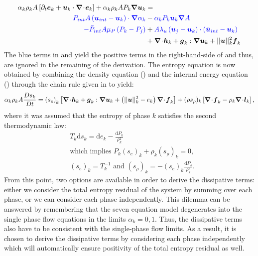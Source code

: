 \begin{align}\label{eq:int-ener-7-eqn-model-sect4}
\alpha_k \rho_k  A \left[ \partial_t \boldsymbol e_k + \boldsymbol u_k \cdot \boldsymbol{\nabla}\! \cdot \! \boldsymbol e_k \right]  + \alpha_k \rho_k A P_k \boldsymbol{\nabla} \boldsymbol u_k &=\nonumber\\
\textcolor{blue}{P_{int} A \left(\boldsymbol u_{int}-\boldsymbol u_k \right) \cdot \boldsymbol{\nabla} \alpha_k} &-  \textcolor{blue}{\alpha_k P_k \boldsymbol u_k \boldsymbol{\nabla} A} \nonumber \\ 
\textcolor{blue}{-\bar{P}_{int} A \mu_P \left(P_k-P_j \right)} &+ \textcolor{blue}{A \lambda_u \left(\boldsymbol u_j-\boldsymbol u_k  \right) \cdot \left(\bar{\boldsymbol u}_{int}- \boldsymbol u_k \right)}\nonumber \\
&+ \boldsymbol{\nabla}\! \cdot \! \boldsymbol h_k + \boldsymbol g_k : \boldsymbol{\nabla} \boldsymbol u_k + || \boldsymbol u ||^2_k \boldsymbol f_k
\end{align}
%
The blue terms in  and  yield the positive terms in the right-hand-side of  and thus, are ignored in the remaining of the derivation. The entropy equation is now obtained by combining the density equation () and the internal energy equation () through the chain rule given in  to yield:
%
\begin{equation}\label{eq:ent-res-7-eqn-diss-terms}
\alpha_k \rho_k A \frac{Ds_k}{Dt} = \left(s_e\right)_k \left[ \div \mbold h_k + \mbold g_k : \grad \mbold u_k +  \left( || \mbold u ||^2_k - e_k\right) \div \mbold f_k  \right] + (\rho s_\rho)_k \left[ \div \mbold f_k - \rho_k \div \mbold l_k \right],
\end{equation}
%
where it was assumed that the entropy of phase $k$ satisfies the second thermodynamic law: 
%
\begin{align}\label{eq:2nd-therm-laws-sect4}
&T_k \text{d} s_k = \text{d}e_k - \frac{\text{d}P_k}{\rho_k^2} \nonumber \\
& \text{which implies } P_k (s_e)_k + \rho_k (s_\rho)_k = 0, \\
& (s_e)_k = T_k^{-1} \text{ and } (s_\rho)_k = - (s_e)_k \frac{\text{d}P_k}{\rho_k^2}. \nonumber
\end{align}
% 
From this point, two options are available in order to derive the dissipative terms: either we consider the total entropy residual of the system by summing  over each phase, or we can consider each phase independently. This dilemma can be answered by remembering that the seven equation model degenerates into the single phase flow equations in the limits $\alpha_k = 0,1$. Thus, the dissipative terms also have to be consistent with the single-phase flow limits. As a result, it is chosen to derive the dissipative terms by considering each phase independently which will automatically ensure positivity of the total entropy residual as well.


